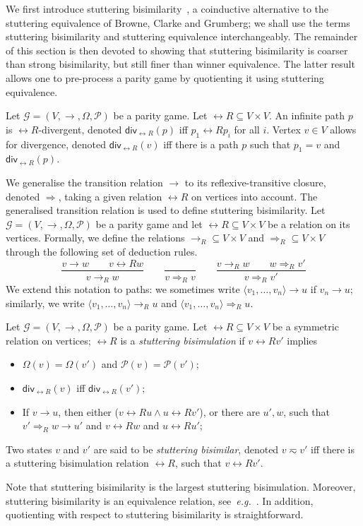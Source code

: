 \documentclass[a4paper]{llncs}
\newcommand{\eg}{\textit{e.g.}\xspace}
\newcommand{\R}{\ensuremath{\rel{R}}}
\newcommand{\game}{\ensuremath{\mathcal{G}}\xspace}
\newcommand{\priority}{\ensuremath{\Omega}\xspace}
\newcommand{\getplayername}{\ensuremath{\mathcal{P}}}
\newcommand{\getplayer}[1]{\getplayername(#1)}
\newcommand{\path}[1]{\ensuremath{\langle #1 \rangle}}
\newcommand{\To}{\ensuremath{\Longrightarrow}}
\newcommand{\divr}[2]{\mathsf{div}_{#1}(#2)}
\newcommand{\stut}{\eqsim}\newcommand{\semistut}{\sim_{\mathrm{semi-st}}}
\begin{document}
We first introduce stuttering bisimilarity~\cite{dNV:95}, a coinductive
alternative to the stuttering equivalence of Browne, Clarke and Grumberg;
we shall use the terms stuttering bisimilarity and stuttering equivalence
interchangeably. The remainder of this section is then devoted to showing
that stuttering bisimilarity is coarser than strong bisimilarity, but
still finer than winner equivalence. The latter result allows one to
pre-process a parity game by quotienting it using stuttering equivalence.



\begin{definition} Let $\game = (V, \to, \priority, \getplayername)$ be
a parity game. Let $\R{} \subseteq V \times V$.
An infinite path $p$ is $\R$-divergent, denoted $\divr{\R}{p}$ iff
$p_1 \R p_i$ for all $i$. Vertex $v \in V$ allows for
divergence, denoted $\divr{\R}{v}$ iff there is a path $p$ such
that $p_1 = v$ and $\divr{\R}{p}$.
\end{definition}
We generalise the transition relation $\to$ to its reflexive-transitive
closure, denoted $\Longrightarrow$, taking a given relation $\R$ on
vertices into account. The generalised transition relation is used
to define stuttering bisimilarity.
Let $\game = (V, \to, \priority, \getplayername)$ be a parity game
and let 
$\R{} \subseteq V \times V$ be a relation on its vertices. Formally, we
define the relations $\to_R \subseteq V \times V$ and $\To_R \subseteq V \times V$ through the following set of deduction rules.
$$
\frac{v \to w \qquad v \R w}{v \to_R w} \qquad
\frac{}{v \To_R v} \qquad
\frac{v \to_R w \qquad w \To_R v'}{v \To_R v'}
$$
We extend this notation to paths: we sometimes write
$\path{v_1,\ldots,v_n} \to u$ if $v_n \to u$; similarly, we write 
$\path{v_1,\ldots,v_n} \to_R u$ and $\path{v_1,\ldots,v_n} \To_R u$.

\begin{definition}\label{def:stut}
  Let $\game = (V,\to,\priority,\getplayername)$ be a parity game. Let $\R \subseteq V
  \times V$ be a symmetric relation on vertices; $\R$ is a \emph{stuttering 
  bisimulation} if $v \R v'$ implies
  \begin{itemize}
    \item $\priority(v) = \priority(v')$ and $\getplayer{v} = \getplayer{v'}$;
    \item $\divr{\R}{v}$ iff $\divr{\R}{v'}$;
    \item If $v \to u$, then either ($v \R u \land u \R v'$), or
          there are $u',w$, such that $v' \To_R w \to u'$ and $v \R w$ and $u
          \R u'$;
  \end{itemize}
  Two states $v$ and $v'$ are said to be \emph{stuttering bisimilar},
  denoted $v \stut
  v'$ iff there is a stuttering bisimulation relation $\R$, such that $v \R v'$.
\end{definition}
Note that stuttering bisimilarity is the largest stuttering
bisimulation.  Moreover, stuttering bisimilarity is an equivalence relation,
see~\eg~\cite{dNV:95,BCG:88}. In addition, quotienting with respect to
stuttering bisimilarity is straightforward.
\end{document}
